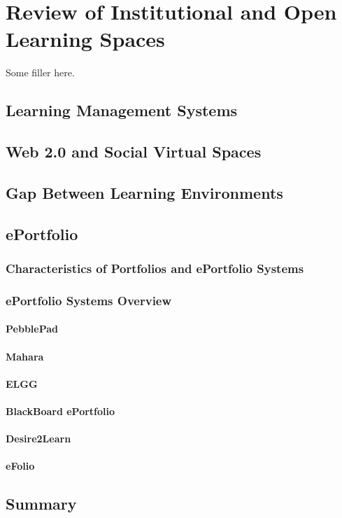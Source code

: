 \chapter{Review of Institutional and Open Learning Spaces \label{cha:systudy}}

Some filler here.

\section{Learning Management Systems}

\section{Web 2.0 and Social Virtual Spaces}

\section{Gap Between Learning Environments}
 
\section{ePortfolio}

\subsection{Characteristics of Portfolios and ePortfolio Systems}

\subsection{ePortfolio Systems Overview}

\subsubsection{PebblePad}

\subsubsection{Mahara}

\subsubsection{ELGG}

\subsubsection{BlackBoard ePortfolio}

\subsubsection{Desire2Learn}

\subsubsection{eFolio}

\section{Summary}